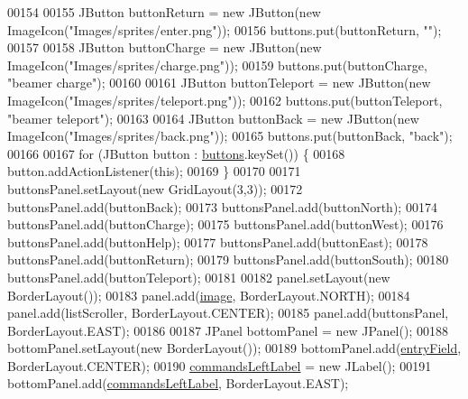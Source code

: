 \begin{DoxyCode}
00154 
00155         JButton buttonReturn = \textcolor{keyword}{new} JButton(\textcolor{keyword}{new} ImageIcon(\textcolor{stringliteral}{"Images/sprites/enter.png"}));
00156         buttons.put(buttonReturn, \textcolor{stringliteral}{""});
00157 
00158         JButton buttonCharge = \textcolor{keyword}{new} JButton(\textcolor{keyword}{new} ImageIcon(\textcolor{stringliteral}{"Images/sprites/charge.png"}));
00159         buttons.put(buttonCharge, \textcolor{stringliteral}{"beamer charge"});
00160 
00161         JButton buttonTeleport = \textcolor{keyword}{new} JButton(\textcolor{keyword}{new} ImageIcon(\textcolor{stringliteral}{"Images/sprites/teleport.png"}));
00162         buttons.put(buttonTeleport, \textcolor{stringliteral}{"beamer teleport"});
00163 
00164         JButton buttonBack = \textcolor{keyword}{new} JButton(\textcolor{keyword}{new} ImageIcon(\textcolor{stringliteral}{"Images/sprites/back.png"}));
00165         buttons.put(buttonBack, \textcolor{stringliteral}{"back"});
00166 
00167         \textcolor{keywordflow}{for} (JButton button : \hyperlink{classpkg__game_1_1UserInterface_adf0313432ad0c09aae5dcb09cb34a7c2}{buttons}.keySet()) \{
00168             button.addActionListener(\textcolor{keyword}{this});
00169         \}
00170 
00171         buttonsPanel.setLayout(\textcolor{keyword}{new} GridLayout(3,3));
00172         buttonsPanel.add(buttonBack);
00173         buttonsPanel.add(buttonNorth);
00174         buttonsPanel.add(buttonCharge);
00175         buttonsPanel.add(buttonWest);
00176         buttonsPanel.add(buttonHelp);
00177         buttonsPanel.add(buttonEast);
00178         buttonsPanel.add(buttonReturn);
00179         buttonsPanel.add(buttonSouth);
00180         buttonsPanel.add(buttonTeleport);
00181 
00182         panel.setLayout(\textcolor{keyword}{new} BorderLayout());
00183         panel.add(\hyperlink{classpkg__game_1_1UserInterface_ac4146c151419321baacf6fb1769e7510}{image}, BorderLayout.NORTH);
00184         panel.add(listScroller, BorderLayout.CENTER);
00185         panel.add(buttonsPanel, BorderLayout.EAST);
00186 
00187         JPanel bottomPanel = \textcolor{keyword}{new} JPanel();
00188         bottomPanel.setLayout(\textcolor{keyword}{new} BorderLayout());
00189         bottomPanel.add(\hyperlink{classpkg__game_1_1UserInterface_ae405fc2ad81ccf31aad56484a9c1c2bc}{entryField}, BorderLayout.CENTER);
00190         \hyperlink{classpkg__game_1_1UserInterface_a8ffc0ac7b194efdbb234aafefe1297b9}{commandsLeftLabel} = \textcolor{keyword}{new} JLabel();
00191         bottomPanel.add(\hyperlink{classpkg__game_1_1UserInterface_a8ffc0ac7b194efdbb234aafefe1297b9}{commandsLeftLabel}, BorderLayout.EAST);

\end{DoxyCode}
